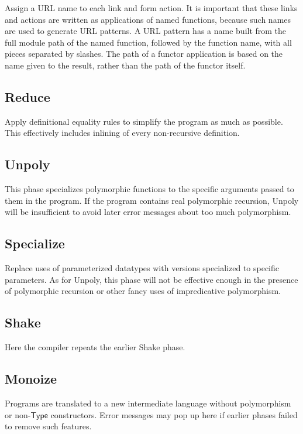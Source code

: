 \documentclass{article}
\newcommand{\mt}[1]{\mathsf{#1}}
\begin{document}
Assign a URL name to each link and form action.  It is important that these links and actions are written as applications of named functions, because such names are used to generate URL patterns.  A URL pattern has a name built from the full module path of the named function, followed by the function name, with all pieces separated by slashes.  The path of a functor application is based on the name given to the result, rather than the path of the functor itself.

\subsection{Reduce}

Apply definitional equality rules to simplify the program as much as possible.  This effectively includes inlining of every non-recursive definition.

\subsection{Unpoly}

This phase specializes polymorphic functions to the specific arguments passed to them in the program.  If the program contains real polymorphic recursion, Unpoly will be insufficient to avoid later error messages about too much polymorphism.

\subsection{Specialize}

Replace uses of parameterized datatypes with versions specialized to specific parameters.  As for Unpoly, this phase will not be effective enough in the presence of polymorphic recursion or other fancy uses of impredicative polymorphism.

\subsection{Shake}

Here the compiler repeats the earlier Shake phase.

\subsection{Monoize}

Programs are translated to a new intermediate language without polymorphism or non-$\mt{Type}$ constructors.  Error messages may pop up here if earlier phases failed to remove such features.
\end{document}
